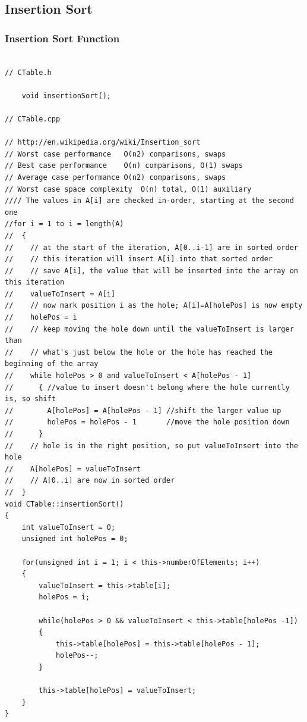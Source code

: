 \documentclass{article}
\begin{document}
		
	
	\subsection{Insertion Sort}
	
		\subsubsection{Insertion Sort Function}
		\begin{lstlisting}[label=CTable-insertionSort, caption=Insertion Sort]
	
// CTable.h
	
    void insertionSort();
    
// CTable.cpp
    
// http://en.wikipedia.org/wiki/Insertion_sort
// Worst case performance	O(n2) comparisons, swaps
// Best case performance	O(n) comparisons, O(1) swaps
// Average case performance	O(n2) comparisons, swaps
// Worst case space complexity	O(n) total, O(1) auxiliary
//// The values in A[i] are checked in-order, starting at the second one
//for i = 1 to i = length(A)
//  {
//    // at the start of the iteration, A[0..i-1] are in sorted order
//    // this iteration will insert A[i] into that sorted order
//    // save A[i], the value that will be inserted into the array on this iteration
//    valueToInsert = A[i]
//    // now mark position i as the hole; A[i]=A[holePos] is now empty
//    holePos = i
//    // keep moving the hole down until the valueToInsert is larger than
//    // what's just below the hole or the hole has reached the beginning of the array
//    while holePos > 0 and valueToInsert < A[holePos - 1]
//      { //value to insert doesn't belong where the hole currently is, so shift
//        A[holePos] = A[holePos - 1] //shift the larger value up
//        holePos = holePos - 1       //move the hole position down
//      }
//    // hole is in the right position, so put valueToInsert into the hole
//    A[holePos] = valueToInsert
//    // A[0..i] are now in sorted order
//  }
void CTable::insertionSort()
{
    int valueToInsert = 0;
    unsigned int holePos = 0;

    for(unsigned int i = 1; i < this->numberOfElements; i++)
    {
        valueToInsert = this->table[i];
        holePos = i;

        while(holePos > 0 && valueToInsert < this->table[holePos -1])
        {
            this->table[holePos] = this->table[holePos - 1];
            holePos--;
        }

        this->table[holePos] = valueToInsert;
    }
}

		\end{lstlisting}
	
\end{document}
